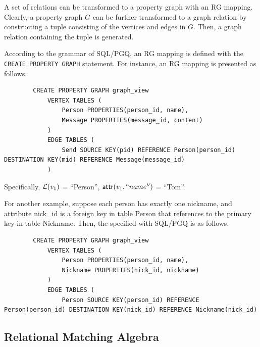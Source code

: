 A set of relations can be transformed to a property graph with an RG mapping.
Clearly, a property graph $G$ can be further transformed to a graph relation by constructing a tuple consisting of the vertices and edges in $G$.
Then, a graph relation containing the tuple is generated.

\begin{example}
    According to the grammar of SQL/PGQ, an RG mapping is defined with the \lstinline{CREATE PROPERTY GRAPH} statement.
    For instance, an RG mapping is presented as follows.
    \begin{lstlisting}
        CREATE PROPERTY GRAPH graph_view
            VERTEX TABLES (
                Person PROPERTIES(person_id, name),
                Message PROPERTIES(message_id, content)
            )
            EDGE TABLES (
                Send SOURCE KEY(pid) REFERENCE Person(person_id) DESTINATION KEY(mid) REFERENCE Message(message_id)
            )
    \end{lstlisting}
    Specifically, \(\mathcal{L}(v_1)\) = ``Person'', \({\mathsf{attr}}(v_1, ``name'')\) = ``Tom''.

    For another example, suppose each person has exactly one nickname, and attribute nick\_id is a foreign key in table Person that references to the primary key in table Nickname.
    Then, the \rgmapping specified with SQL/PGQ is as follows.
    \begin{lstlisting}
        CREATE PROPERTY GRAPH graph_view
            VERTEX TABLES (
                Person PROPERTIES(person_id, name),
                Nickname PROPERTIES(nick_id, nickname)
            )
            EDGE TABLES (
                Person SOURCE KEY(person_id) REFERENCE Person(person_id) DESTINATION KEY(nick_id) REFERENCE Nickname(nick_id)
    \end{lstlisting}

\end{example}


\subsection{Relational Matching Algebra}
\label{sec:graph-relational-algebra}


